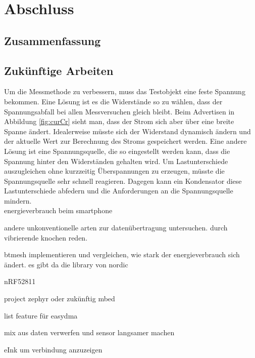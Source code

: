 \chapter{Abschluss}
\label{ch:closure}

\section{Zusammenfassung}


\section{Zukünftige Arbeiten}
Um die Messmethode zu verbessern, muss das Testobjekt eine feste Spannung bekommen.
Eine Lösung ist es die Widerstände so zu wählen, dass der Spannungsabfall bei allen Messversuchen gleich bleibt.
Beim Advertisen in Abbildung \ref{fig:curCr} sieht man, dass der Strom sich aber über eine breite Spanne ändert.
Idealerweise müsste sich der Widerstand dynamisch ändern und der aktuelle Wert zur Berechnung des Stroms gespeichert werden.
Eine andere Lösung ist eine Spannungsquelle, die so eingestellt werden kann, dass die Spannung hinter den Widerständen gehalten wird.
Um Lastunterschiede auszugleichen ohne kurzzeitig Überspannungen zu erzeugen, müsste die Spannungsquelle sehr schnell reagieren.
Dagegen kann ein Kondensator diese Lastunterschiede abfedern und die Anforderungen an die Spannungsquelle mindern.\\


energieverbrauch beim smartphone

andere unkonventionelle arten zur datenübertragung untersuchen. durch vibrierende knochen reden.

btmesh implementieren und vergleichen, wie stark der energieverbrauch sich ändert. es gibt da die library von nordic

nRF52811

project zephyr oder zukünftig mbed

list feature für easydma

mix aus daten verwerfen und sensor langsamer machen

eInk um verbindung anzuzeigen
